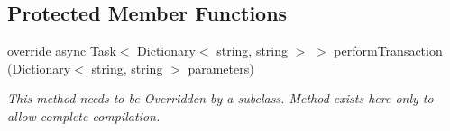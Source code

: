 \subsection*{Protected Member Functions}
\begin{DoxyCompactItemize}
\item 
override async Task$<$ Dictionary$<$ string, string $>$ $>$ \mbox{\hyperlink{class_form_sim_1_1_t_c_p_handler_a7762d051722dd2ac8bee1c26043760f3}{perform\+Transaction}} (Dictionary$<$ string, string $>$ parameters)
\begin{DoxyCompactList}\small\item\em This method needs to be Overridden by a subclass. Method exists here only to allow complete compilation. \end{DoxyCompactList}\end{DoxyCompactItemize}
